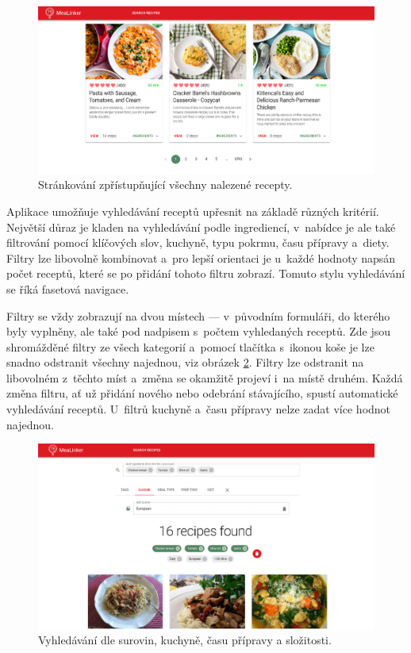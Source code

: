 \begin{figure}[h!]\centering
\includegraphics[width=140mm]{../img/pagination}
\caption{Stránkování zpřístupňující všechny nalezené recepty.}
\label{obr05:pagination}
\end{figure}

Aplikace umožňuje vyhledávání receptů upřesnit na základě různých kritérií. Největší důraz je kladen na vyhledávání podle ingrediencí, v~nabídce je ale také filtrování pomocí klíčových slov, kuchyně, typu pokrmu, času přípravy a~diety. Filtry lze libovolně kombinovat a~pro lepší orientaci je u~každé hodnoty napsán počet receptů, které se po přidání tohoto filtru zobrazí. Tomuto stylu vyhledávání se říká fasetová navigace.

Filtry se vždy zobrazují na dvou místech --- v~původním formuláři, do kterého byly vyplněny, ale také pod nadpisem s~počtem vyhledaných receptů. Zde jsou shromážděné filtry ze všech kategorií a~pomocí tlačítka s~ikonou koše je lze snadno odstranit všechny najednou, viz obrázek \ref{obr05:filter-search}. Filtry lze odstranit na libovolném z~těchto míst a~změna se okamžitě projeví i~na místě druhém. Každá změna filtru, ať už přidání nového nebo odebrání stávajícího, spustí automatické vyhledávání receptů. U~filtrů kuchyně a~času přípravy nelze zadat více hodnot najednou.

\begin{figure}[h!]\centering
\includegraphics[width=140mm]{../img/filter-search}
\caption{Vyhledávání dle surovin, kuchyně, času přípravy a složitosti.}
\label{obr05:filter-search}
\end{figure}


